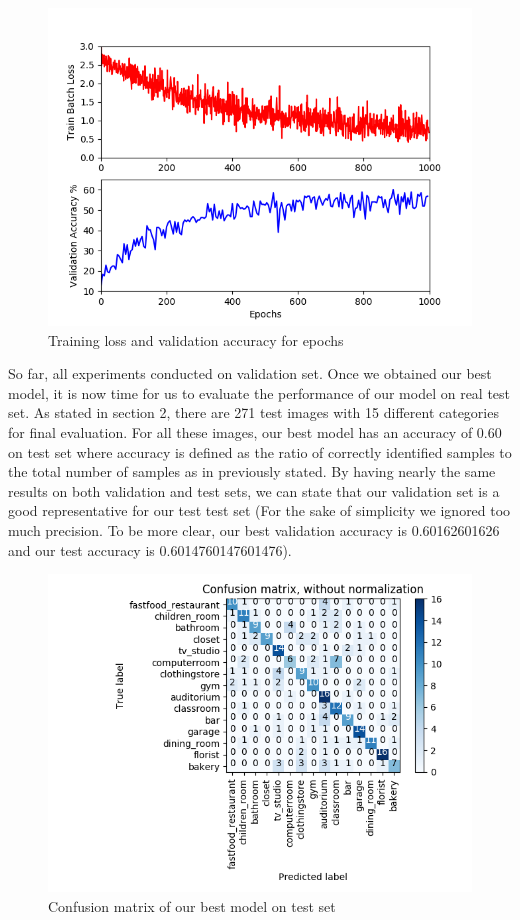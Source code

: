 \documentclass{article}
\begin{document}
\begin{figure}
  \includegraphics[width=\linewidth]{myTrainingProcess.png}
  \caption{Training loss and validation accuracy for epochs}
  \label{fig:myTrainingProcess}
\end{figure}

So far, all experiments conducted on validation set. Once we obtained our best model, it is now time for us to evaluate the performance of our model on real test set. As stated in section 2, there are 271 test images with 15 different categories for final evaluation. For all these images, our best model has an accuracy of 0.60 on test set where accuracy is defined as the ratio of correctly identified samples to the total number of samples as in previously stated. By having nearly the same results on both validation and test sets, we can state that our validation set is a good representative for our test test set (For the sake of simplicity we ignored too much precision. To be more clear, our best validation accuracy is 0.60162601626 and our test accuracy is 0.6014760147601476).

\begin{figure}
  \includegraphics[width=\linewidth]{myConfusionMatrix.png}
  \caption{Confusion matrix of our best model on test set}
  \label{fig:myConfusionMatrix}
\end{figure}
\end{document}
